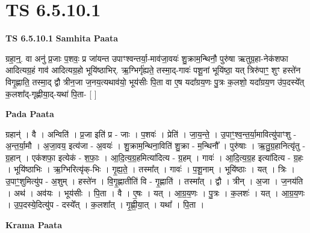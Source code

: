 \documentclass[17pt]{extarticle}
\begin{document}
\section{ TS 6.5.10.1 }

\textbf{TS 6.5.10.1 } \newline
\textbf{Samhita Paata} \newline

ग्रहा॒न्॒. वा अनु॑ प्र॒जाः प॒शवः॒ प्र जा॑यन्त उपाꣳश्वन्तर्या॒-माव॑जा॒वयः॑ शु॒क्राम॒न्थिनौ॒ पुरु॑षा ऋतुग्र॒हा-नेक॑शफा आदित्यग्र॒हं गाव॑ आदित्यग्र॒हो भूयि॑ष्ठाभिर्. ऋ॒ग्भिर्गृ॑ह्यते॒ तस्मा॒द्-गावः॑ पशू॒नां भूयि॑ष्ठा॒ यत् त्रिरु॑पाꣳ॒॒ शुꣳ हस्ते॑न विगृ॒ह्णाति॒ तस्मा॒द् द्वौ त्रीन॒जा ज॒नय॒त्यथाव॑यो॒ भूय॑सीः पि॒ता वा ए॒ष यदा᳚ग्रय॒णः पु॒त्रः क॒लशो॒ यदा᳚ग्रय॒ण उ॑प॒दस्ये᳚त् क॒लशा᳚द्-गृह्णीया॒द्-यथा॑ पि॒ता- [  ] \newline

\textbf{Pada Paata} \newline

ग्रहान्॑ । वै । अन्विति॑ । प्र॒जा इति॑ प्र - जाः । प॒शवः॑ । प्रेति॑ । जा॒य॒न्ते॒ । उ॒पाꣳ॒॒श्व॒न्त॒र्या॒मावित्यु॑पाꣳशु - अ॒न्त॒र्या॒मौ । अ॒जा॒वय॒ इत्य॑जा - अ॒वयः॑ । शु॒क्राम॒न्थिना॒विति॑ शु॒क्रा - म॒न्थिनौ᳚ । पुरु॑षाः । ऋ॒तु॒ग्र॒हानित्यृ॑तु - ग्र॒हान् । एक॑शफा॒ इत्येक॑ - श॒फाः॒ । आ॒दि॒त्य॒ग्र॒हमित्या॑दित्य - ग्र॒हम् । गावः॑ । आ॒दि॒त्य॒ग्र॒ह इत्या॑दित्य - ग्र॒हः । भूयि॑ष्ठाभिः । ऋ॒ग्भिरित्यृ॑क्-भिः । गृ॒ह्य॒ते॒ । तस्मा᳚त् । गावः॑ । प॒शू॒नाम् । भूयि॑ष्ठाः । यत् । त्रिः । उ॒पाꣳ॒॒शुमित्यु॑प - अ॒शुम् । हस्ते॑न । वि॒गृ॒ह्णातीति॑ वि - गृ॒ह्णाति॑ । तस्मा᳚त् । द्वौ । त्रीन् । अ॒जा । ज॒नय॑ति । अथ॑ । अव॑यः । भूय॑सीः । पि॒ता । वै । ए॒षः । यत् । आ॒ग्र॒य॒णः । पु॒त्रः । क॒लशः॑ । यत् । आ॒ग्र॒य॒णः । उ॒प॒दस्ये॒दित्यु॑प - दस्ये᳚त् । क॒लशा᳚त् । गृ॒ह्णी॒या॒त् । यथा᳚ । पि॒ता ।  \newline


\textbf{Krama Paata} \newline
\end{document}
